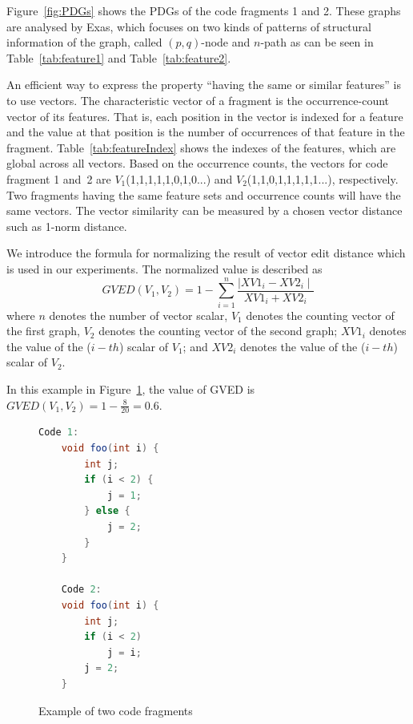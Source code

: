 
Figure~\ref{fig:PDGs} shows the PDGs of the code fragments 1 and
2. These graphs are analysed by Exas, which focuses on two kinds of
patterns of structural information of the graph, called $\left(p,q\right)$-node
and $n$-path as can be seen in Table~\ref{tab:feature1} and
Table~\ref{tab:feature2}.

An efficient way to express the property ``having the same or similar
features'' is to use vectors. The characteristic vector of a fragment
is the occurrence-count vector of its features. That is, each position
in the vector is indexed for a feature and the value at that position
is the number of occurrences of that feature in the
fragment. Table~\ref{tab:featureIndex} shows the indexes of the
features, which are global across all vectors. Based on the occurrence
counts, the vectors for code fragment 1 and~2 are
$V_1$(1,1,1,1,1,0,1,0...) and $V_2$(1,1,0,1,1,1,1,1...),
respectively. Two fragments having the same feature sets and
occurrence counts will have the same vectors. The
vector similarity can be measured by a chosen vector distance such as
1-norm distance.

We introduce the formula for normalizing the result of vector edit
distance which is used in our experiments. The normalized
value is described as
\[GVED \left( V_1, V_2 \right) = 1 - \sum_{i=1}^{n} \frac{ \mid XV1_i - XV2_i \mid}{XV1_i + XV2_i}\]
where $n$ denotes the number of vector scalar, $V_1$ denotes the
counting vector of the first graph, $V_2$ denotes the counting vector
of the second graph; $XV1_i$ denotes the value of the ($i-th$) scalar
of $V_1$; and $XV2_i$ denotes the value of the ($i-th$) scalar of
$V_2$.

In this example in Figure~\ref{code1code2}, the value of GVED is
$GVED\left(V_1, V_2\right) = 1 - \frac{8 }{20} = 0.6 $.

\begin{figure}
\begin{lstlisting}[language=JAVA]
	Code 1:
	void foo(int i) {
		int j;
		if (i < 2) {
			j = 1;
		} else {
			j = 2;
		}
	}

	Code 2:
	void foo(int i) {
		int j;
		if (i < 2)
			j = i;	
		j = 2;
	}
\end{lstlisting}
\caption{Example of two code fragments}
\label{code1code2}
\end{figure}


